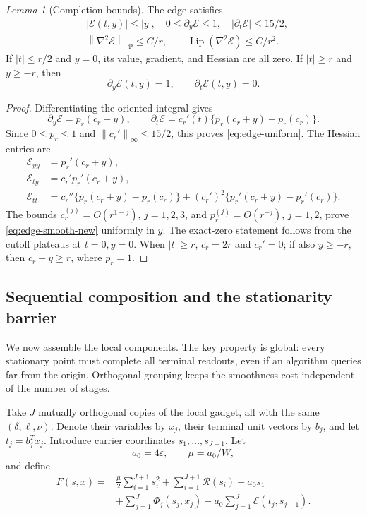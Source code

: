 \documentclass[11pt]{article}
\newtheorem{lemma}[theorem]{Lemma}
\theoremstyle{remark}
\newtheorem{lemma}[lemma]{Lemma}
\theoremstyle{remark}
\newcommand{\eps}{\varepsilon}
\newcommand{\norm}[1]{\left\lVert#1\right\rVert}
\newcommand{\Lip}{\operatorname{Lip}}
\newcommand{\op}{\mathrm{op}}
\begin{document}
\begin{lemma}[Completion bounds]\label{lem:new-edge}
The edge satisfies
\begin{align}
 &|\mathcal E(t,y)|\le |y|,\quad
 0\le\partial_y\mathcal E\le1,\quad
 |\partial_t\mathcal E|\le15/2,\label{eq:edge-uniform}\\
 &\norm{\nabla^2\mathcal E}_{\op}\le C/r,
 \qquad \Lip(\nabla^2\mathcal E)\le C/r^2.\label{eq:edge-smooth-new}
\end{align}
If $|t|\le r/2$ and $y=0$, its value, gradient, and Hessian are all zero. If $|t|\ge r$ and $y\ge-r$, then
\begin{equation}\label{eq:edge-force}
 \partial_y\mathcal E(t,y)=1,\qquad \partial_t\mathcal E(t,y)=0.
\end{equation}
\end{lemma}
\begin{proof}
Differentiating the oriented integral gives
\[
 \partial_y\mathcal E=p_r(c_r+y),\qquad
 \partial_t\mathcal E=c_r'(t)\{p_r(c_r+y)-p_r(c_r)\}.
\]
Since $0\le p_r\le1$ and $\norm{c_r'}_\infty\le15/2$, this proves \eqref{eq:edge-uniform}. The Hessian entries are
\begin{align*}
 \mathcal E_{yy}&=p_r'(c_r+y),\\
 \mathcal E_{ty}&=c_r'p_r'(c_r+y),\\
 \mathcal E_{tt}&=c_r''\{p_r(c_r+y)-p_r(c_r)\}
 +(c_r')^2\{p_r'(c_r+y)-p_r'(c_r)\}.
\end{align*}
The bounds $c_r^{(j)}=O(r^{1-j})$, $j=1,2,3$, and $p_r^{(j)}=O(r^{-j})$, $j=1,2$, prove \eqref{eq:edge-smooth-new} uniformly in $y$.
The exact-zero statement follows from the cutoff plateaus at $t=0,y=0$. When $|t|\ge r$, $c_r=2r$ and $c_r'=0$; if also $y\ge-r$, then $c_r+y\ge r$, where $p_r=1$.
\end{proof}

\subsection{Sequential composition and the stationarity barrier}
\label{sec:new-composition}
We now assemble the local components. The key property is global: every stationary point must complete all terminal readouts, even if an algorithm queries far from the origin. Orthogonal grouping keeps the smoothness cost independent of the number of stages.

Take $J$ mutually orthogonal copies of the local gadget, all with the same $(\delta,\ell,\nu)$. Denote their variables by $x_j$, their terminal unit vectors by $b_j$, and let $t_j=b_j^Tx_j$. Introduce carrier coordinates $s_1,\ldots,s_{J+1}$. Let
\[
 a_0=4\eps,\qquad \mu=a_0/W,
\]
and define
\begin{equation}\label{eq:new-composed-objective}
 \begin{split}
 F(s,x)={}&\frac\mu2\sum_{i=1}^{J+1}s_i^2
  +\sum_{i=1}^{J+1}\mathcal R(s_i)-a_0s_1\\
 &+\sum_{j=1}^J\Phi_j(s_j,x_j)
  -a_0\sum_{j=1}^J\mathcal E(t_j,s_{j+1}).
 \end{split}
\end{equation}
\end{document}
